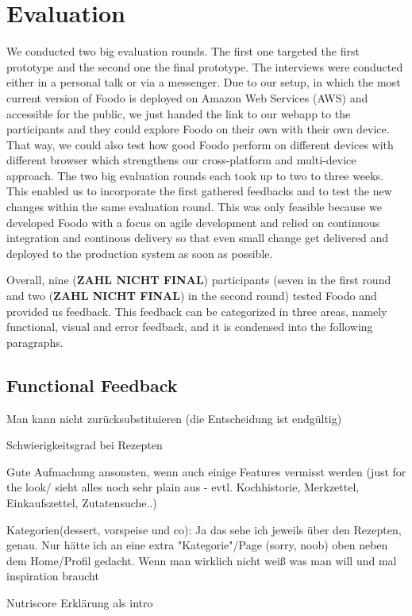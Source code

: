 \chapter{Evaluation}
We conducted two big evaluation rounds. The first one targeted the first prototype and the second one the final prototype. The interviews were conducted either in a personal talk or via a messenger. Due to our setup, in which the most current version of Foodo is deployed on Amazon Web Services (AWS) and accessible for the public, we just handed the link to our webapp to the participants and they could explore Foodo on their own with their own device. That way, we could also test how good Foodo perform on different devices with different browser which strengthens our cross-platform and multi-device approach. The two big evaluation rounds each took up to two to three weeks. This enabled us to incorporate the first gathered feedbacks and to test the new changes within the same evaluation round. This was only feasible because we developed Foodo with a focus on agile development and relied on continuous integration and continous delivery so that even small change get delivered and deployed to the production system as soon as possible. 

Overall, nine (\textbf{ZAHL NICHT FINAL}) participants (seven in the first round and two (\textbf{ZAHL NICHT FINAL}) in the second round) tested Foodo and provided us feedback. This feedback can be categorized in three areas, namely functional, visual and error feedback, and it is condensed into the following paragraphs.

\section{Functional Feedback}

Man kann nicht zurücksubstituieren (die Entscheidung ist endgültig)

Schwierigkeitsgrad bei Rezepten 

    Gute Aufmachung ansonsten, wenn auch einige Features vermisst werden (just for the look/ sieht alles noch sehr plain aus - evtl. Kochhistorie, Merkzettel, Einkaufszettel, Zutatensuche..)
    
    Kategorien(dessert, vorspeise und  co): Ja das sehe ich jeweils über den Rezepten, genau. Nur hätte ich an eine extra "Kategorie"/Page (sorry, noob) oben neben dem Home/Profil gedacht. Wenn man wirklich nicht weiß was man will und mal inspiration braucht 
    
        Nutriscore Erklärung als intro
        
